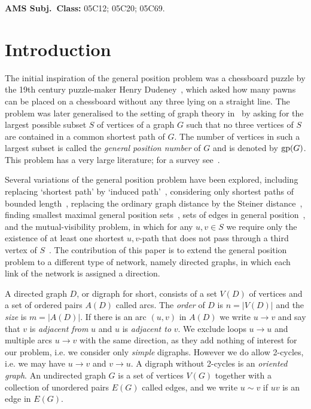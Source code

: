 \documentclass[a4paper,12pt]{article}
\theoremstyle{definition}
\newcommand{\gp}{{\rm gp}}
\begin{document}
	\medskip\noindent
	
	{\bf AMS Subj.\ Class:} 05C12; 05C20; 05C69.
	
	
	\section{Introduction}\label{sec:intro}
	
	
	The initial inspiration of the general position problem was a chessboard puzzle by the 19th century puzzle-maker Henry Dudeney~\cite{dudeney-1917}, which asked how many pawns can be placed on a chessboard without any three lying on a straight line. The problem was later generalised to the setting of graph theory in~\cite{ref1,ref9} by asking for the largest possible subset $S$ of vertices of a graph $G$ such that no three vertices of $S$ are contained in a common shortest path of $G$. The number of vertices in such a largest subset is called the \emph{general position number} of $G$ and is denoted by $\gp (G)$. This problem has a very large literature; for a survey see~\cite{survey}.
	
	Several variations of the general position problem have been explored, including replacing `shortest path' by `induced path'~\cite{ThoChaTui}, considering only shortest paths of bounded length~\cite{KlaRalYer}, replacing the ordinary graph distance by the Steiner distance~\cite{KlaKuzPetYer}, finding smallest maximal general position sets~\cite{lowergp}, sets of edges in general position~\cite{Manuel}, and the mutual-visibility problem, in which for any $u,v \in S$ we require only the existence of at least one shortest $u,v$-path that does not pass through a third vertex of $S$~\cite{DiStefano}. The contribution of this paper is to extend the general position problem to a different type of network, namely directed graphs, in which each link of the network is assigned a direction. 
	
	A directed graph $D$, or digraph for short, consists of a set $V(D)$ of vertices and a set of ordered pairs $A(D)$ called arcs. The \emph{order} of $D$ is $n = |V(D)|$ and the \emph{size} is $m = |A(D)|$. If there is an arc $(u,v)$ in $A(D)$ we write $u \rightarrow v$ and say that $v$ is \emph{adjacent from} $u$ and $u$ is \emph{adjacent to} $v$. We exclude loops $u \rightarrow u$ and multiple arcs $u \rightarrow v$ with the same direction, as they add nothing of interest for our problem, i.e. we consider only \emph{simple} digraphs. However we do allow 2-cycles, i.e. we may have $u \rightarrow v$ and $v \rightarrow u$. A digraph without 2-cycles is an \emph{oriented graph}. An undirected graph $G$ is a set of vertices $V(G)$ together with a collection of unordered pairs $E(G)$ called edges, and we write $u \sim v$ if $uv$ is an edge in $E(G)$.
	
\end{document}
